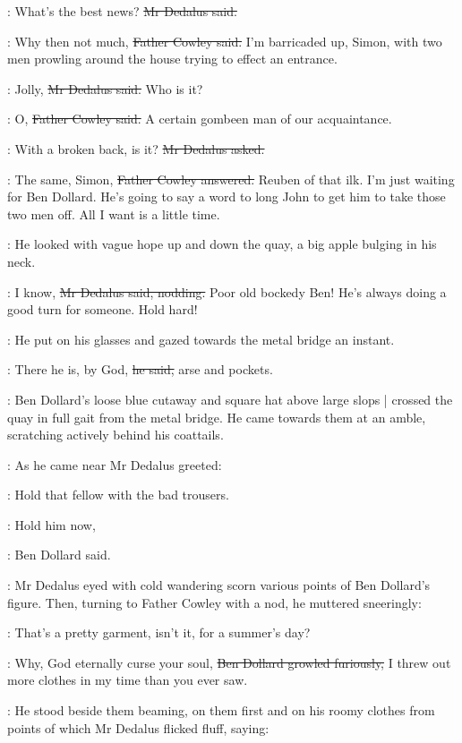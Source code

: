 \simon:
What's the best news?
\sout{Mr Dedalus said.}

\cowley:
Why then not much,
\sout{Father Cowley said.}
I'm barricaded up, Simon,
with two men prowling around the house
trying to effect an entrance.

\simon:
Jolly,
\sout{Mr Dedalus said.}
Who is it?

\cowley:
O,
\sout{Father Cowley said.}
A certain gombeen man of our acquaintance.

\simon:
With a broken back, is it?
\sout{Mr Dedalus asked.}

\cowley:
The same, Simon,
\sout{Father Cowley answered.}
Reuben of that ilk.
I'm just waiting for Ben Dollard.
He's going to say a word to long John
to get him to take those two men off.
All I want is a little time.

:
He looked with vague hope up and down the quay,
a big apple bulging in his neck.

\simon:
I know,
\sout{Mr Dedalus said, nodding.}
Poor old bockedy Ben!
He's always doing a good turn for someone.
Hold hard!

:
He put on his glasses
and gazed towards the metal bridge an instant.

\simon:
There he is, by God,
\sout{he said,}
arse and pockets.

:
Ben Dollard's loose blue cutaway and square hat above large slops |
crossed the quay in full gait
from the metal bridge.
He came towards them at an amble,
scratching actively behind his coattails.

:
As he came near
Mr Dedalus greeted:

\simon:
Hold that fellow with the bad trousers.

\dollard:
Hold him now,

:
Ben Dollard said.

:
Mr Dedalus eyed with cold wandering scorn
various points of Ben Dollard's figure.
Then,
turning to Father Cowley with a nod,
he muttered sneeringly:

\simon:
That's a pretty garment, isn't it,
for a summer's day?

\dollard:
Why, God eternally curse your soul,
\sout{Ben Dollard growled furiously,}
I threw out more clothes in my time than you ever saw.

:
He stood beside them beaming,
on them first and on his roomy clothes
from points of which Mr Dedalus flicked fluff,
saying:

